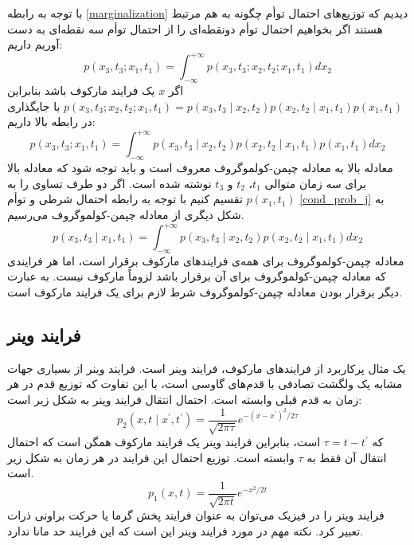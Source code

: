 با توجه به رابطه \ref{marginalization} دیدیم که توزیع‌های احتمال توأم چگونه به هم مرتبط هستند اگر بخواهیم احتمال توأم دونقطه‌ای را از احتمال توأم سه نقطه‌ای به دست آوریم داریم:
$$
  p\left(x_{3}, t_{3} ; x_{1}, t_{1}\right)=\int_{-\infty}^{+\infty} p\left(x_{3}, t_{3}; x_{2}, t_{2}; x_{1}, t_{1}\right) d x_{2}
$$
 اگر $x$ یک فرایند مارکوف باشد بنابراین $p(x_{3}, t_{3} ; x_{2}, t_{2}; x_{1}, t_{1}) = p(x_{3}, t_{3} \mid x_{2}, t_{2}) p(x_{2}, t_{2} \mid x_{1}, t_{1}) p(x_{1}, t_{1})$ با جایگذاری در رابطه بالا داریم:
 \begin{equation}
  p\left(x_{3}, t_{3}; x_{1}, t_1\right)=\int_{-\infty}^{+\infty} p\left(x_{3}, t_3 \mid x_{2}, t_2\right) p\left(x_{2}, t_2 \mid x_{1}, t_1\right) p\left(x_{1}, t_1\right) d x_{2}
  \label{ck_equation}
\end{equation}
معادله بالا به معادله چپمن-کولموگروف معروف است و باید توجه شود که معادله بالا برای سه زمان متوالی $t_1$، $t_2$ و $t_3$ نوشته شده است. اگر دو طرف تساوی را به $p(x_{1}, t_1)$ تقسیم کنیم با توجه به رابطه احتمال شرطی و توأم \ref{cond_prob_j} به شکل دیگری از معادله چپمن-کولموگروف می‌رسیم.
\begin{equation}
  p\left(x_{3}, t_3 \mid x_{1}, t_1\right)=\int_{-\infty}^{+\infty} p\left(x_{3}, t_3 \mid x_{2}, t_2\right) p\left(x_{2}, t_2 \mid x_{1}, t_1\right) d x_{2}
  \label{ck_equation_cond}
\end{equation}
معادله چپمن-کولموگروف برای همه‌ی فرایندهای مارکوف برقرار است، اما هر فرایندی که معادله چپمن-کولموگروف برای آن برقرار باشد لزوماً مارکوف نیست. به عبارت دیگر برقرار بودن معادله چپمن-کولموگروف شرط لازم برای یک فرایند مارکوف است.

\subsection{فرایند وینر}

یک مثال پرکاربرد از فرایندهای مارکوف، فرایند وینر است. فرایند وینر از بسیاری جهات مشابه یک ولگشت تصادفی با قدم‌های گاوسی است، با این تفاوت که توزیع قدم‌ در هر زمان به قدم قبلی وابسته است. احتمال انتقال فرایند وینر به شکل زیر است:
\begin{equation}
  p_{2}\left(x, t \mid x^{\prime}, t^{\prime}\right)=\frac{1}{\sqrt{2 \pi \tau}} e^{-\left(x-x^{\prime}\right)^{2} / 2 \tau}
\end{equation}
که $\tau = t - t^\prime$ است، بنابراین فرایند وینر یک فرایند مارکوف همگن است که احتمال انتقال آن فقط به $\tau$ وابسته است. توزیع احتمال این فرایند در هر زمان به شکل زیر است.
\begin{equation}
  p_{1}(x, t)=\frac{1}{\sqrt{2 \pi t}} e^{-x^{2} / 2 t}
  \end{equation}
فرایند وینر را در فیزیک می‌توان به عنوان فرایند پخش گرما یا حرکت براونی ذرات تعبیر کرد. نکته مهم در مورد فرایند وینر این است که این فرایند حد مانا ندارد.\cite{risken_fokker-planck_1984}

